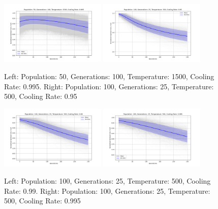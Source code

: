 \documentclass{article}
\begin{document}
    \begin{figure}[H]
        \centering
        \includegraphics[width=0.45\textwidth]{genetic_simulated_annealing_hybrid/appendix/Population_50_Generations_100_Temperature_1500_CoolingRate_0.995.png}
        \includegraphics[width=0.45\textwidth]{genetic_simulated_annealing_hybrid/appendix/Population_100_Generations_25_Temperature_500_CoolingRate_0.95.png}
        \caption{Left: Population: 50, Generations: 100, Temperature: 1500, Cooling Rate: 0.995. Right: Population: 100, Generations: 25, Temperature: 500, Cooling Rate: 0.95}
        \label{fig:app_ga_50_100_1500_995_100_25_500_95}
    \end{figure}

    \begin{figure}[H]
        \centering
        \includegraphics[width=0.45\textwidth]{genetic_simulated_annealing_hybrid/appendix/Population_100_Generations_25_Temperature_500_CoolingRate_0.99.png}
        \includegraphics[width=0.45\textwidth]{genetic_simulated_annealing_hybrid/appendix/Population_100_Generations_25_Temperature_500_CoolingRate_0.995.png}
        \caption{Left: Population: 100, Generations: 25, Temperature: 500, Cooling Rate: 0.99. Right: Population: 100, Generations: 25, Temperature: 500, Cooling Rate: 0.995}
        \label{fig:app_ga_100_25_500_99_995}
    \end{figure}
\end{document}
